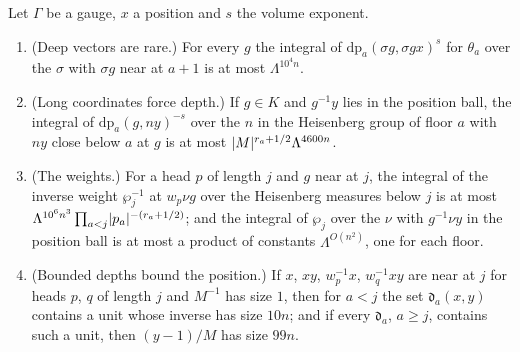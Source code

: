 \begin{proposition}[Depth]\label{prop:depth}
Let $\Gamma$ be a gauge, $x$ a position and $s$ the volume exponent.
\begin{enumerate}[label=\textup{(\alph*)}]
\item (Deep vectors are rare.) For every $g$ the integral of $\mathrm{dp}_a(\sigma g,\sigma gx)^s$ for $\theta_a$ over the $\sigma$ with $\sigma g$ near at $a+1$ is at most $\Lambda^{10^4n}$.
\item (Long coordinates force depth.) If $g\in K$ and $g^{-1}y$ lies in the position ball, the integral of $\mathrm{dp}_a(g,ny)^{-s}$ over the $n$ in the Heisenberg group of floor $a$ with $ny$ close below
$a$ at $g$ is at most $\lvert M\rvert^{r_a+1/2}\Lambda^{4600n}$.
\item (The weights.) For a head $p$ of length $j$ and $g$ near at $j$, the integral of the inverse weight $\wp_j^{-1}$ at $w_p\nu g$ over the Heisenberg measures below $j$ is at most $\Lambda^{10^6n^3}\prod_{a<j}\lvert p_a\rvert^{-(r_a+1/2)}$;
and the integral of $\wp_j$ over the $\nu$ with $g^{-1}\nu y$ in the position ball is at most a product of constants $\Lambda^{O(n^2)}$, one for each floor.
\item (Bounded depths bound the position.) If $x$, $xy$, $w_p^{-1}x$, $w_q^{-1}xy$ are near at $j$ for heads $p$, $q$ of length $j$ and $M^{-1}$ has size $1$, then for $a<j$ the set $\mathfrak d_a(x,y)$ contains a unit
whose inverse has size $10n$; and if every $\mathfrak d_a$, $a\ge j$, contains such a unit, then $(y-1)/M$ has size $99n$.
\end{enumerate}
\end{proposition}
